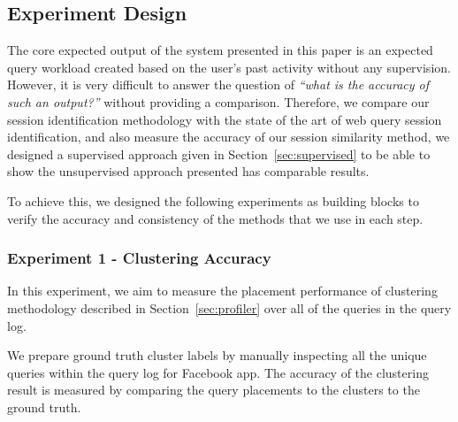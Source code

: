 


\subsection{Experiment Design}

The core expected output of the system presented in this paper is an expected query workload created based on the user's past activity without any supervision.
However, it is very difficult to answer the question of \textit{``what is the accuracy of such an output?''} without providing a comparison.
Therefore, we compare our session identification methodology with the state of the art of web query session identification, and also measure the accuracy of our session similarity method, we designed a supervised approach given in Section~\ref{sec:supervised} to be able to show the unsupervised approach presented has comparable results.

To achieve this, we designed the following experiments as building blocks to verify the accuracy and consistency of the methods that we use in each step.

\subsubsection{Experiment 1 - Clustering Accuracy}

In this experiment, we aim to measure the placement performance of clustering methodology described in Section~\ref{sec:profiler} over all of the queries in the query log.

We prepare ground truth cluster labels by manually inspecting all the unique queries within the query log for Facebook app. The accuracy of the clustering result is measured by comparing the query placements to the clusters to the ground truth.

